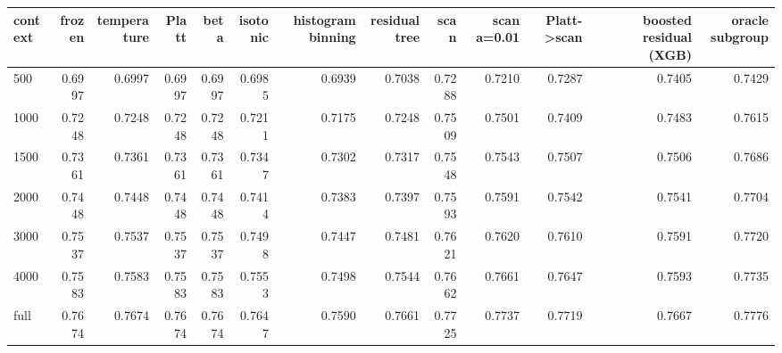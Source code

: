\begin{tabular}{lrrrrrrrrrrrr}
\toprule
context & frozen & temperature & Platt & beta & isotonic & histogram binning & residual tree & scan & scan a=0.01 & Platt->scan & boosted residual (XGB) & oracle subgroup \\
\midrule
500 & 0.6997 & 0.6997 & 0.6997 & 0.6997 & 0.6985 & 0.6939 & 0.7038 & 0.7288 & 0.7210 & 0.7287 & 0.7405 & 0.7429 \\
1000 & 0.7248 & 0.7248 & 0.7248 & 0.7248 & 0.7211 & 0.7175 & 0.7248 & 0.7509 & 0.7501 & 0.7409 & 0.7483 & 0.7615 \\
1500 & 0.7361 & 0.7361 & 0.7361 & 0.7361 & 0.7347 & 0.7302 & 0.7317 & 0.7548 & 0.7543 & 0.7507 & 0.7506 & 0.7686 \\
2000 & 0.7448 & 0.7448 & 0.7448 & 0.7448 & 0.7414 & 0.7383 & 0.7397 & 0.7593 & 0.7591 & 0.7542 & 0.7541 & 0.7704 \\
3000 & 0.7537 & 0.7537 & 0.7537 & 0.7537 & 0.7498 & 0.7447 & 0.7481 & 0.7621 & 0.7620 & 0.7610 & 0.7591 & 0.7720 \\
4000 & 0.7583 & 0.7583 & 0.7583 & 0.7583 & 0.7553 & 0.7498 & 0.7544 & 0.7662 & 0.7661 & 0.7647 & 0.7593 & 0.7735 \\
full & 0.7674 & 0.7674 & 0.7674 & 0.7674 & 0.7647 & 0.7590 & 0.7661 & 0.7725 & 0.7737 & 0.7719 & 0.7667 & 0.7776 \\
\bottomrule
\end{tabular}
